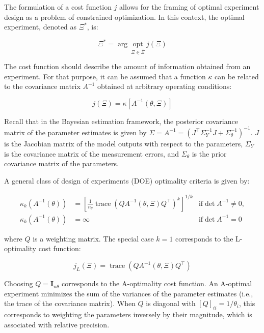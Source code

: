 \documentclass[../Article_Design_of_Experiment.tex]{subfiles}
\begin{document}
	The formulation of a cost function $j$ allows for the framing of optimal experiment design as a problem of constrained optimization. In this context, the optimal experiment, denoted as $\Xi^*$, is:
	
	{\footnotesize \begin{equation} \Xi^* = \arg~\underset{\Xi \in \bar{\Xi}}{\text{opt}}~j\left(\Xi\right) \end{equation} }
	
	The cost function should describe the amount of information obtained from an experiment. For that purpose, it can be assumed that a function $\kappa$ can be related to the covariance matrix $A^{-1}$ obtained at arbitrary operating conditions:
	
	{\footnotesize \begin{equation} j(\Xi) = \kappa\left[ A^{-1}(\theta, \Xi) \right] \end{equation} }
	
	Recall that in the Bayesian estimation framework, the posterior covariance matrix of the parameter estimates is given by $\Sigma = A^{-1} = \left(J^\top \Sigma_Y^{-1} J + \Sigma_\theta^{-1}\right)^{-1} $. $J$ is the Jacobian matrix of the model outputs with respect to the parameters, $\Sigma_Y$ is the covariance matrix of the measurement errors, and $\Sigma_\theta$ is the prior covariance matrix of the parameters.
	
	A general class of design of experiments (DOE) optimality criteria is given by:
	
	{\footnotesize 
		\begin{align} 
			\kappa_k\left( A^{-1}(\theta) \right) &= \left[ \frac{1}{n_\theta} \operatorname{trace}\left( Q A^{-1}(\theta, \Xi) Q^\top \right)^k \right]^{1/k} & \text{if} \det A^{-1} \neq 0, \nonumber \\ 
			\kappa_k\left( A^{-1}(\theta) \right) &= \infty & \text{if} \det A^{-1} = 0
		\end{align} }
	
	where $Q$ is a weighting matrix. The special case $k=1$ corresponds to the L-optimality cost function:
	
	{\footnotesize \begin{equation} j_L(\Xi) = \operatorname{trace} \left( Q A^{-1}(\theta, \Xi) Q^\top \right) \end{equation} }
	
	Choosing $Q = \mathbf{I}_{n\theta}$ corresponds to the A-optimality cost function. An A-optimal experiment minimizes the sum of the variances of the parameter estimates (i.e., the trace of the covariance matrix). When $Q$ is diagonal with $[Q]_{ii} = 1/\theta_i$, this corresponds to weighting the parameters inversely by their magnitude, which is associated with relative precision.
	
\end{document}
